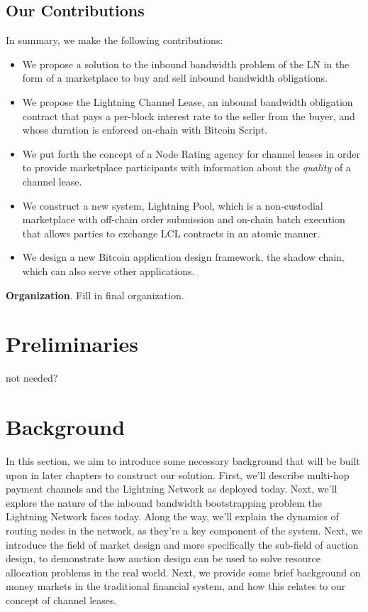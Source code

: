 \documentclass[10pt,a4paper]{article}
\theoremstyle{definition}
\begin{document}
\subsection{Our Contributions}

In summary, we make the following contributions: \begin{itemize} \item We
        propose a solution to the inbound bandwidth problem of the LN in the
        form of a marketplace to buy and sell inbound bandwidth obligations.
    \item We propose the Lightning Channel Lease, an inbound bandwidth
        obligation contract that pays a per-block interest rate to the seller
        from the buyer, and whose duration is enforced on-chain with Bitcoin
        Script.  \item We put forth the concept of a Node Rating agency for
        channel leases in order to provide marketplace participants with
        information about the \emph{quality} of a channel lease.  \item We
        construct a new system, Lightning Pool, which is a non-custodial
        marketplace with off-chain order submission and on-chain batch
        execution that allows parties to exchange LCL contracts in an atomic
        manner.  \item We design a new Bitcoin application design framework,
the shadow chain, which can also serve other applications.  \end{itemize}
 
 
 \textbf{Organization}. Fill in final organization. 
 

\section{Preliminaries}

not needed? 



\section{Background}

In this section, we aim to introduce some necessary background that will be
built upon in later chapters to construct our solution. First, we'll describe
multi-hop payment channels and the Lightning Network as deployed today. Next,
we'll explore the nature of the inbound bandwidth bootstrapping problem the
Lightning Network faces today. Along the way, we'll explain the dynamics of
routing nodes in the network, as they're a key component of the system. Next,
we introduce the field of market design and more specifically the sub-field of auction
design, to demonstrate how auction design can be used to solve resource
allocation problems in the real world. Next, we provide some brief background
on money markets in the traditional financial system, and how this relates to
our concept of channel leases. 
\end{document}
